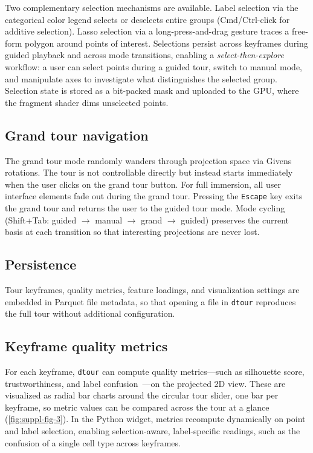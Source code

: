 \documentclass[11pt]{article}
\newcommand{\dtour}{\texorpdfstring{\texttt{dtour}\xspace}{dtour}}
\begin{document}
Two complementary selection mechanisms are available. Label selection via the categorical color legend selects or deselects entire groups (Cmd/Ctrl-click for additive selection). Lasso selection via a long-press-and-drag gesture traces a free-form polygon around points of interest. Selections persist across keyframes during guided playback and across mode transitions, enabling a \emph{select-then-explore} workflow: a user can select points during a guided tour, switch to manual mode, and manipulate axes to investigate what distinguishes the selected group. Selection state is stored as a bit-packed mask and uploaded to the GPU, where the fragment shader dims unselected points.

\subsection{Grand tour navigation}
The grand tour mode randomly wanders through projection space via Givens rotations. The tour is not controllable directly but instead starts immediately when the user clicks on the grand tour button. For full immersion, all user interface elements fade out during the grand tour. Pressing the \texttt{Escape} key exits the grand tour and returns the user to the guided tour mode. Mode cycling (Shift+Tab: guided $\to$ manual $\to$ grand $\to$ guided) preserves the current basis at each transition so that interesting projections are never lost.

\subsection{Persistence}
Tour keyframes, quality metrics, feature loadings, and visualization settings are embedded in Parquet file metadata, so that opening a file in \dtour{} reproduces the full tour without additional configuration.

\subsection{Keyframe quality metrics}
For each keyframe, \dtour{} can compute quality metrics---such as silhouette score, trustworthiness, and label confusion~\cite{manz2024general}---on the projected 2D view. These are visualized as radial bar charts around the circular tour slider, one bar per keyframe, so metric values can be compared across the tour at a glance (\autoref{fig:suppl-fig-3}). In the Python widget, metrics recompute dynamically on point and label selection, enabling selection-aware, label-specific readings, such as the confusion of a single cell type across keyframes.
\end{document}
